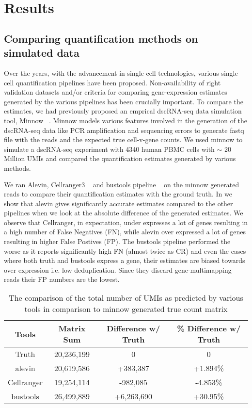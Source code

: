 \section{Results}
\subsection{Comparing quantification methods on simulated data}
\label{subsec:alv2_sims}
Over the years, with the advancement in single cell technologies, various single cell quantification 
pipelines have been proposed. Non-availability of right validation datasets and/or criteria for comparing 
gene-expression estimates generated by the various pipelines has been crucially important. To compare the estimates, we 
had previously proposed an emprical dscRNA-seq data simulation tool, Minnow ~\citep{sarkar2019minnow}. 
Minnow models various features involved in the generation of the dscRNA-seq data like PCR amplification and 
sequencing errors to generate fastq file with the reads and the expected true cell-v-gene counts. 
We used minnow to simulate a dscRNA-seq experiment with 4340 human PBMC cells with $\sim$ 
20 Million UMIs and compared the quantification estimates generated by various methods.

We ran Alevin, Cellranger3 ~\citep{tenx} and bustools pipeline ~\citep{melsted2019modular} on the minnow 
generated reads to compare their quantification estimates with the ground truth. 
In  we show that alevin gives significantly accurate estimates 
compared to the other pipelines when we look at the absolute difference of the generated estimates. We observe 
that Cellranger, in expectation, under expresses a lot of genes resulting in a high number of False Negatives (FN), 
while alevin over expressed a lot of genes resulting in higher False Postives (FP). 
The bustools pipeline performed the worse as it reports significantly high FN (almost twice as CR) 
and even the cases where both truth and bustools express a gene, their estimates are biased towards 
over expression i.e. low deduplication. Since they discard gene-multimapping reads their FP 
numbers are the lowest.

\begin{table}[h!]
	\centering
	 \begin{tabular}{|| c | c c c||} 
		 \hline
		 Tools & Matrix Sum & Difference w/ Truth & \% Difference w/ Truth \\ [0.5ex] 
		 \hline\hline
		 Truth & 20,236,199  & 0 & 0 \\ 
		 \hline
		 alevin & 20,619,586 & +383,387 & +1.894\% \\
		 \hline
		 Cellranger & 19,254,114 & -982,085 & -4.853\% \\
		 \hline
		 bustools & 26,499,889 & +6,263,690 & +30.95\% \\ [1ex] 
		 \hline
 	\end{tabular}
	\caption{The comparison of the total number of UMIs as predicted by various tools 
	in comparison to minnow generated true count matrix }
	\label{tab:matrix_sum}
\end{table}

